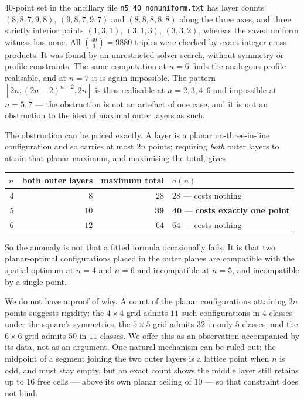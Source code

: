 \documentclass[11pt,a4paper]{article}
\begin{document}
$40$-point set in the ancillary file \texttt{n5\_40\_nonuniform.txt} has layer counts $(8,8,7,9,8)$,
$(9,8,7,9,7)$ and $(8,8,8,8,8)$ along the three axes, and three strictly interior points $(1,3,1)$, $(3,1,3)$,
$(3,3,2)$, whereas the saved uniform witness has none.  All $\binom{40}{3}=9880$ triples were checked by exact
integer cross products.  It was found by an unrestricted solver search, without symmetry or profile constraints.  The same computation at $n=6$ finds the
analogous profile realisable, and at $n=7$ it is again impossible.  The pattern $[2n,(2n-2)^{n-2},2n]$ is thus
realisable at $n=2,3,4,6$ and impossible at $n=5,7$ --- the obstruction is not an artefact of one case, and it
is not an obstruction to the idea of maximal outer layers as such.

The obstruction can be priced exactly.  A layer is a planar no-three-in-line configuration and so carries at
most $2n$ points; requiring \emph{both} outer layers to attain that planar maximum, and maximising the total,
gives
\begin{center}\begin{tabular}{rrrl}\toprule
$n$ & both outer layers & maximum total & $a(n)$\\\midrule
4 & $8$ & $28$ & $28$ --- costs nothing\\
5 & $10$ & $\mathbf{39}$ & $\mathbf{40}$ --- \textbf{costs exactly one point}\\
6 & $12$ & $64$ & $64$ --- costs nothing\\\bottomrule
\end{tabular}\end{center}
So the anomaly is not that a fitted formula occasionally fails.  It is that two planar-optimal configurations
placed in the outer planes are compatible with the spatial optimum at $n=4$ and $n=6$ and incompatible at
$n=5$, and incompatible by a single point.

We do not have a proof of why.  A count of the planar configurations attaining $2n$ points suggests rigidity:
the $4\times4$ grid admits $11$ such configurations in $4$ classes under the square's symmetries, the $5\times5$
grid admits $32$ in only $5$ classes, and the $6\times6$ grid admits $50$ in $11$ classes.  We offer this as an
observation accompanied by its data, not as an argument.  One natural mechanism can be ruled out: the midpoint
of a segment joining the two outer layers is a lattice point when $n$ is odd, and must stay empty, but an exact
count shows the middle layer still retains up to $16$ free cells --- above its own planar ceiling of $10$ --- so
that constraint does not bind.
\end{document}
